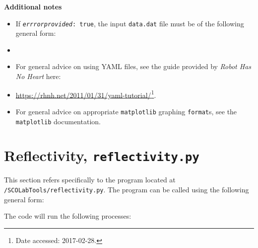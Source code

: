 \textbf{Additional notes}
\begin{itemize}
\item 	If \colorbox{lightergray}{\texttt{\textit{errrorprovided}: true}}, the input \texttt{data.dat} file must be of the following general form:
\item[] 
\item	For general advice on using YAML files, see the guide provided by \textit{Robot Has No Heart} here:
\item[] \tab \href{https://rhnh.net/2011/01/31/yaml-tutorial/}{https://rhnh.net/2011/01/31/yaml-tutorial/}\footnote{Date accessed: 2017-02-28.}.
\item	For general advice on appropriate \texttt{matplotlib} graphing \texttt{format}s, see the \texttt{matplotlib} documentation.
\end{itemize}

\pagebreak
\section{Reflectivity, \texttt{reflectivity.py}}
This section refers specifically to the program located at \texttt{\root{}/SCOLabTools/reflectivity.py}. The program can be called using the following general form:


The code will run the following processes:

